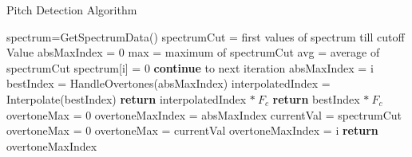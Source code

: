 \begin{algorithm}[H]
    \caption{Pitch Detection Algorithm} \label{pda}
   \begin{algorithmic}[1]
        \State spectrum=GetSpectrumData()
        \State spectrumCut = first values of spectrum till cutoff Value 
        \State absMaxIndex = 0 
        \State max = maximum of spectrumCut
        \State avg = average of spectrumCut
                \State spectrum[i] = 0
                \State \textbf{continue} to next iteration
            \EndIf
                \State absMaxIndex = i
            \EndIf
        \EndFor
        \State bestIndex = HandleOvertones(absMaxIndex)
        \State interpolatedIndex = Interpolate(bestIndex)
            \State \textbf{return} interpolatedIndex $* \ F_c$
        \EndIf
        \State \textbf{return} bestIndex $* \ F_c$
   \EndFunction
    \State
        \State overtoneMax = 0
        \State overtoneMaxIndex = absMaxIndex
            \State currentVal = spectrumCut
                \State overtoneMax = 0
            \EndIf
                    \State overtoneMax = currentVal
                    \State overtoneMaxIndex = i
                \EndIf
            \EndIf
        \EndFor
        \State \textbf{return} overtoneMaxIndex
    \EndFunction
\end{algorithmic}
\end{algorithm}
\newpage
